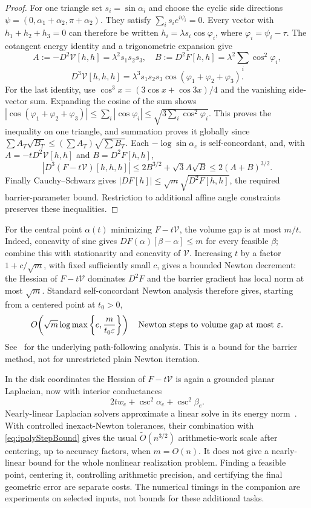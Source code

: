\documentclass[11pt,a4paper]{article}
\numberwithin{equation}{section}
\theoremstyle{definition}
\theoremstyle{remark}
\begin{document}
\begin{proof}
For one triangle set $s_i=\sin\alpha_i$ and choose the cyclic side
directions $\psi=(0,\alpha_1+\alpha_2,\pi+\alpha_2)$.
They satisfy $\sum_i s_i e^{i\psi_i}=0$. Every vector with
$h_1+h_2+h_3=0$ can therefore be written
$h_i=\lambda s_i\cos\varphi_i$, where $\varphi_i=\psi_i-\tau$.
The cotangent energy identity and a trigonometric expansion give
\[
 A:=-D^2\mathcal V[h,h]=\lambda^2s_1s_2s_3,\quad
 B:=D^2F[h,h]=\lambda^2\sum_i\cos^2\varphi_i,
\]
\[
 D^3\mathcal V[h,h,h]
   =\lambda^3s_1s_2s_3\cos(\varphi_1+\varphi_2+\varphi_3).
\]
For the last identity, use $\cos^3 x=(3\cos x+\cos3x)/4$ and the
vanishing side-vector sum. Expanding the cosine of the sum shows
$|\cos(\varphi_1+\varphi_2+\varphi_3)|
\le\sum_i|\cos\varphi_i|\le\sqrt{3\sum_i\cos^2\varphi_i}$.
This proves the inequality on one triangle, and summation proves it
globally since $\sum A_T\sqrt{B_T}\le(\sum A_T)\sqrt{\sum B_T}$.
Each $-\log\sin\alpha_c$ is self-concordant, and, with
$A=-tD^2\mathcal V[h,h]$ and $B=D^2F[h,h]$,
\[
 |D^3(F-t\mathcal V)[h,h,h]|
 \le2B^{3/2}+\sqrt3 A\sqrt B\le2(A+B)^{3/2}.
\]
Finally Cauchy--Schwarz gives $|DF[h]|\le\sqrt m\sqrt{D^2F[h,h]}$,
the required barrier-parameter bound. Restriction to additional affine
angle constraints preserves these inequalities.
\end{proof}

For the central point $\alpha(t)$ minimizing $F-t\mathcal V$, the
volume gap is at most $m/t$. Indeed, concavity of sine gives
$DF(\alpha)[\beta-\alpha]\le m$ for every feasible $\beta$;
combine this with stationarity and concavity of $\mathcal V$.
Increasing $t$ by a factor $1+c/\sqrt m$, with fixed sufficiently
small $c$, gives a bounded Newton decrement: the Hessian of
$F-t\mathcal V$ dominates $D^2F$ and the barrier gradient has local
norm at most $\sqrt m$. Standard self-concordant Newton analysis
therefore gives, starting from a centered point at $t_0>0$,
\begin{equation}
 O\!\left(\sqrt m\log\max\left\{e,\frac{m}{t_0\varepsilon}\right\}\right)
 \quad\hbox{Newton steps to volume gap at most }\varepsilon.
 \label{eq:ipolyStepBound}
\end{equation}
See~\cite[Chapter~11]{BoydVandenberghe} for the underlying path-following
analysis. This is a bound for the barrier method, not for unrestricted
plain Newton iteration.

In the disk coordinates the Hessian of $F-t\mathcal V$ is again a
grounded planar Laplacian, now with interior conductances
\[
 2t w_e+\csc^2\alpha_e+\csc^2\beta_e.
\]
Nearly-linear Laplacian solvers approximate a linear solve in its energy
norm~\cite{SpielmanTengSolvers}. With controlled inexact-Newton
tolerances, their combination with \eqref{eq:ipolyStepBound} gives the
usual $\widetilde O(n^{3/2})$ arithmetic-work scale after centering,
up to accuracy factors, when $m=O(n)$. It does not give a nearly-linear
bound for the whole nonlinear realization problem. Finding a feasible
point, centering it, controlling arithmetic precision, and certifying
the final geometric error are separate costs. The numerical timings in
the companion are experiments on selected inputs, not bounds for these
additional tasks.
\end{document}
